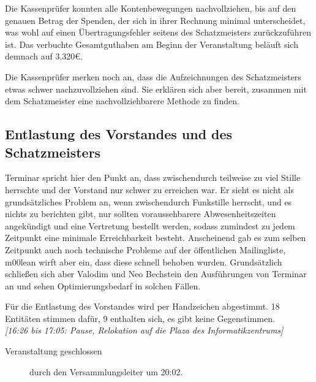 \documentclass[a4paper,12pt]{scrartcl}
\begin{document}
Die Kassenprüfer konnten alle Kontenbewegungen nachvollziehen, bis auf den
genauen Betrag der Spenden, der sich in ihrer Rechnung minimal unterscheidet,
was wohl auf einen Übertragungsfehler seitens des Schatzmeisters zurückzuführen
ist. Das verbuchte Gesamtguthaben am Beginn der Veranstaltung beläuft sich
demnach auf 3.320€.

Die Kassenprüfer merken noch an, dass die Aufzeichnungen des Schatzmeisters
etwas schwer nachzuvollziehen sind. Sie erklären sich aber bereit, zusammen
mit dem Schatzmeister eine nachvollziehbarere Methode zu finden.

\subsection{Entlastung des Vorstandes und des Schatzmeisters}
Terminar spricht hier den Punkt an, dass zwischendurch teilweise zu viel Stille
herrschte und der Vorstand nur schwer zu erreichen war. Er sieht es nicht als
grundsätzliches Problem an, wenn zwischendurch Funkstille herrscht, und es
nichts zu berichten gibt, nur sollten voraussehbarere Abwesenheitszeiten
angekündigt und eine Vertretung bestellt werden, sodass zumindest zu jedem
Zeitpunkt eine minimale Erreichbarkeit besteht. Anscheinend gab es zum selben
Zeitpunkt auch noch technische Probleme auf der öffentlichen Mailingliste,
m00lean wirft aber ein, dass diese schnell behoben wurden. Grundsätzlich
schließen sich aber Valodim und Neo Bechstein den Ausführungen von Terminar
an und sehen Optimierungsbedarf in solchen Fällen.

Für die Entlastung des Vorstandes wird per Handzeichen abgestimmt. 18 Entitäten
stimmen dafür, 9 enthalten sich, es gibt keine Gegenstimmen. \\

\emph{[16:26 bis 17:05: Pause, Relokation auf die Plaza des Informatikzentrums]}






\begin{description}
\item[Veranstaltung geschlossen] durch den Versammlungsleiter um 20:02.
\end{description}
\end{document}
